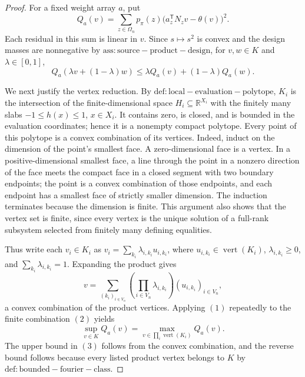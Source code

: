 \documentclass{article}
\begin{document}
\begin{proof}
For a fixed weight array \(a\), put
\[
Q_a(v)=\sum_{z\in\Omega_n}p_{\pi}(z)
\bigl(a_z^{\mathsf T}N_zv-\theta(v)\bigr)^2.
\]
Each residual in this sum is linear in \(v\). Since \(s\mapsto s^2\) is convex and the design masses are nonnegative by \(\mathrm{ass:source-product-design}\), for \(v,w\in K\) and \(\lambda\in[0,1]\),
\[
Q_a(\lambda v+(1-\lambda)w)
\le \lambda Q_a(v)+(1-\lambda)Q_a(w).
\tag{1}
\]

We next justify the vertex reduction. By \(\mathrm{def:local-evaluation-polytope}\), \(K_i\) is the intersection of the finite-dimensional space \(H_i\subseteq\mathbb R^{X_i}\) with the finitely many slabs \(-1\le h(x)\le1\), \(x\in X_i\). It contains zero, is closed, and is bounded in the evaluation coordinates; hence it is a nonempty compact polytope. Every point of this polytope is a convex combination of its vertices. Indeed, induct on the dimension of the point's smallest face. A zero-dimensional face is a vertex. In a positive-dimensional smallest face, a line through the point in a nonzero direction of the face meets the compact face in a closed segment with two boundary endpoints; the point is a convex combination of those endpoints, and each endpoint has a smallest face of strictly smaller dimension. The induction terminates because the dimension is finite. This argument also shows that the vertex set is finite, since every vertex is the unique solution of a full-rank subsystem selected from finitely many defining equalities.

Thus write each \(v_i\in K_i\) as \(v_i=\sum_{k_i}\lambda_{i,k_i}u_{i,k_i}\), where \(u_{i,k_i}\in\operatorname{vert}(K_i)\), \(\lambda_{i,k_i}\ge0\), and \(\sum_{k_i}\lambda_{i,k_i}=1\). Expanding the product gives
\[
v=\sum_{(k_i)_{i\in V_n}}
\left(\prod_{i\in V_n}\lambda_{i,k_i}\right)
(u_{i,k_i})_{i\in V_n},
\tag{2}
\]
a convex combination of the product vertices. Applying \((1)\) repeatedly to the finite combination \((2)\) yields
\[
\sup_{v\in K}Q_a(v)
=\max_{v\in\prod_i\operatorname{vert}(K_i)}Q_a(v).
\tag{3}
\]
The upper bound in \((3)\) follows from the convex combination, and the reverse bound follows because every listed product vertex belongs to \(K\) by \(\mathrm{def:bounded-fourier-class}\).


\end{proof}
\end{document}
